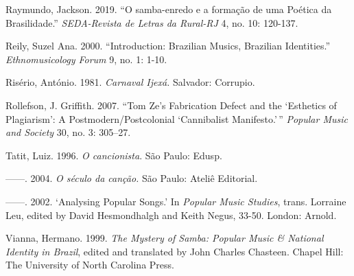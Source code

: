 \documentclass[twoside]{article}
\begin{document}
\begin{hangparas}{15pt}{1}
Raymundo, Jackson. 2019. ``O samba-enredo e a formação de uma
Poética da Brasilidade.'' \emph{SEDA-Revista de Letras da Rural-RJ} 4,
no. 10: 120-137.

Reily, Suzel Ana. 2000. ``Introduction: Brazilian Musics,
Brazilian Identities.'' \emph{Ethnomusicology Forum} 9, no. 1: 1-10.

Risério, António. 1981. \emph{Carnaval Ijexá.} Salvador:
Corrupio.

Rollefson, J. Griffith. 2007. ``Tom Ze's Fabrication Defect
and the `Esthetics of Plagiarism': A Postmodern/Postcolonial
`Cannibalist Manifesto.'\,'' \emph{Popular Music and Society} 30, no. 3:
305--27.

Tatit, Luiz. 1996. \emph{O cancionista}. São Paulo: Edusp.

------. 2004. \emph{O século da canção.} São Paulo: Ateliê
Editorial.

------. 2002. `Analysing Popular Songs.' In \emph{Popular
Music Studies}, trans. Lorraine Leu, edited by David Hesmondhalgh and
Keith Negus, 33-50. London: Arnold.

Vianna, Hermano. 1999. \emph{The Mystery of Samba: Popular
Music \& National Identity in Brazil}, edited and translated by John
Charles Chasteen. Chapel Hill: The University of North Carolina Press.

\end{hangparas}
\end{document}
